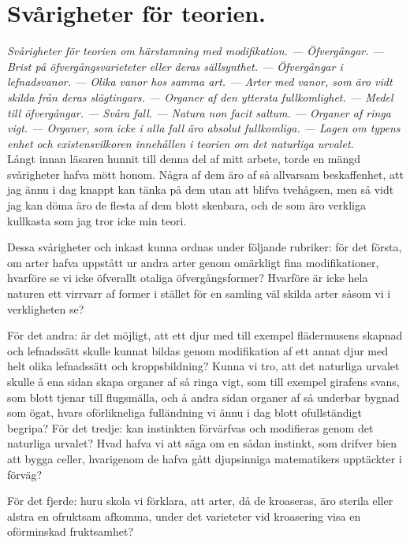 




\chapter{Svårigheter för teorien.}

{\it
Svårigheter för teorien om härstamning med modifikation. — Öfvergångar. — Brist på öfvergångsvarieteter eller deras sällsynthet. — Öfvergångar i lefnadsvanor. — Olika vanor hos samma art. — Arter med vanor, som äro vidt skilda från deras slägtingars. — Organer af den yttersta fullkomlighet. — Medel till öfvergångar. — Svåra fall. — Natura non facit saltum. — Organer af ringa vigt. — Organer, som icke i alla fall äro absolut fullkomliga. — Lagen om typens enhet och existensvilkoren innehållen i teorien om det naturliga urvalet.
}\\[0.5cm]

Långt innan läsaren hunnit till denna del af mitt arbete, torde en mängd svårigheter hafva mött honom. Några af dem äro af så allvarsam beskaffenhet, att jag ännu i dag knappt kan tänka på dem utan att blifva tvehågsen, men så vidt jag kan döma äro de flesta af dem blott skenbara, och de som äro verkliga kullkasta som jag tror icke min teori.

Dessa svårigheter och inkast kunna ordnas under följande rubriker: för det första, om arter hafva uppstått ur andra arter genom omärkligt fina modifikationer, hvarföre se vi icke öfverallt otaliga öfvergångsformer? Hvarföre är icke hela naturen ett virrvarr af former i stället för en samling väl skilda arter såsom vi i verkligheten se?

För det andra: är det möjligt, att ett djur med till exempel flädermusens skapnad och lefnadssätt skulle kunnat bildas genom modifikation af ett annat djur med helt olika lefnadssätt och kroppsbildning? Kunna vi tro, att det naturliga urvalet skulle å ena sidan skapa organer af så ringa vigt, som till exempel girafens svans, som blott tjenar till flugsmälla, och å andra sidan organer af så underbar bygnad som ögat, hvars oförlikneliga fulländning vi ännu i dag blott ofullständigt begripa?
För det tredje: kan instinkten förvärfvas och modifieras genom det naturliga urvalet? Hvad hafva vi att säga om en sådan instinkt, som drifver bien att bygga celler, hvarigenom de hafva gått djupsinniga matematikers upptäckter i förväg?

För det fjerde: huru skola vi förklara, att arter, då de kroaseras, äro sterila eller alstra en ofruktsam afkomma, under det varieteter vid kroasering visa en oförminskad fruktsamhet?

